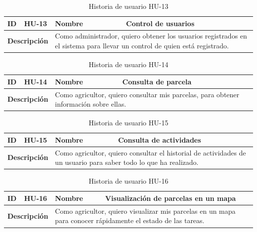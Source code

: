 \begin{table}[H]
    \centering
    \begin{tabular}{|p{2cm}|p{4cm}|p{2cm}|p{4cm}|}
        \hline
        \textbf{ID} & HU-13 & \textbf{Nombre} & Control de usuarios \\
        \hline
        \multicolumn{2}{|p{6cm}|}{\textbf{Descripción}} & \multicolumn{2}{p{6cm}|}{Como administrador, quiero obtener los usuarios registrados en el sistema para llevar un control de quien está registrado.} \\
        \hline
    \end{tabular}
    \caption{Historia de usuario HU-13}
    \label{tab:hu_13}
\end{table}

\begin{table}[H]
    \centering
    \begin{tabular}{|p{2cm}|p{4cm}|p{2cm}|p{4cm}|}
        \hline
        \textbf{ID} & HU-14 & \textbf{Nombre} & Consulta de parcela \\
        \hline
        \multicolumn{2}{|p{6cm}|}{\textbf{Descripción}} & \multicolumn{2}{p{6cm}|}{Como agricultor, quiero consultar mis parcelas, para obtener información sobre ellas.} \\
        \hline
    \end{tabular}
    \caption{Historia de usuario HU-14}
    \label{tab:hu_14}
\end{table}

\begin{table}[H]
    \centering
    \begin{tabular}{|p{2cm}|p{4cm}|p{2cm}|p{4cm}|}
        \hline
        \textbf{ID} & HU-15 & \textbf{Nombre} & Consulta de actividades \\
        \hline
        \multicolumn{2}{|p{6cm}|}{\textbf{Descripción}} & \multicolumn{2}{p{6cm}|}{Como agricultor, quiero consultar el historial de actividades de un usuario para saber todo lo que ha realizado.} \\
        \hline
    \end{tabular}
    \caption{Historia de usuario HU-15}
    \label{tab:hu_15}
\end{table}

\begin{table}[H]
    \centering
    \begin{tabular}{|p{2cm}|p{4cm}|p{2cm}|p{4cm}|}
        \hline
        \textbf{ID} & HU-16 & \textbf{Nombre} & Visualización de parcelas en un mapa \\
        \hline
        \multicolumn{2}{|p{6cm}|}{\textbf{Descripción}} & \multicolumn{2}{p{6cm}|}{Como agricultor, quiero visualizar mis parcelas en un mapa para conocer rápidamente el estado de las tareas.} \\
        \hline
    \end{tabular}
    \caption{Historia de usuario HU-16}
    \label{tab:hu_16}
\end{table}


